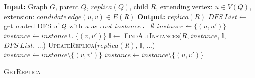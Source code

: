 \begin{algorithm}
	\dontprintsemicolon
	\nonl \textbf{Input:} Graph $G$, parent $Q$, $replica(Q)$, child $R$, extending vertex: $u\in V(Q)$, extension: $candidate\ edge (u,v) \in E(R)$\;
	\nonl \textbf{Output:} $replica(R)$ \;
	$DFS\ List\leftarrow$ get rooted \textsc{DFS} of $Q$ with $u$ as $root$ \;
	$instance \coloneq \emptyset$\;
	{
		$instance\leftarrow \{(u,u')\}$ \;
		{
			$instance\leftarrow instance \cup \{(v,v')\}$\;
			$\mathbb{I}\leftarrow$ \textsc{FindAllInstances($R$, $instance$, $\mathbb{I}$, $DFS\ List$, ...)}\;
			\textsc{UpdateReplica($replica(R)$, $\mathbb{I}$, ...)}\;
			$instance\leftarrow instance \setminus \{(v,v')\}$\;
		}
		$instance\leftarrow instance \setminus \{(u,u')\}$\;
	}
	\caption{\textsc{GetReplica}}\label{algo:getreplica}
\end{algorithm}

